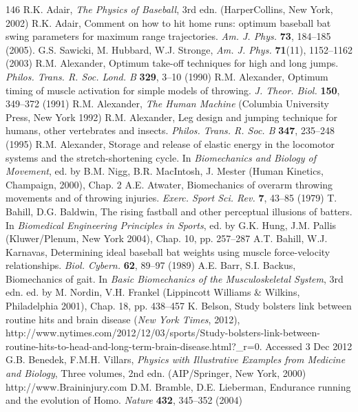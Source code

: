 \documentclass[12pt]{book}
\begin{document}
\begin{thebibliography}{146}
 R.K. Adair, \textit{The Physics of Baseball}, 3rd edn. (HarperCollins, New York, 2002)
 R.K. Adair, Comment on how to hit home runs: optimum baseball bat swing parameters for maximum range trajectories. \textit{Am. J. Phys.} \textbf{73}, 184--185 (2005). G.S. Sawicki, M. Hubbard, W.J. Stronge, \textit{Am. J. Phys.} \textbf{71}(11), 1152--1162 (2003)
 R.M. Alexander, Optimum take-off techniques for high and long jumps. \textit{Philos. Trans. R. Soc. Lond. B} \textbf{329}, 3--10 (1990)
 R.M. Alexander, Optimum timing of muscle activation for simple models of throwing. \textit{J. Theor. Biol.} \textbf{150}, 349--372 (1991)
 R.M. Alexander, \textit{The Human Machine} (Columbia University Press, New York 1992)
 R.M. Alexander, Leg design and jumping technique for humans, other vertebrates and insects. \textit{Philos. Trans. R. Soc. B} \textbf{347}, 235--248 (1995)
 R.M. Alexander, Storage and release of elastic energy in the locomotor systems and the stretch-shortening cycle. In \textit{Biomechanics and Biology of Movement}, ed. by B.M. Nigg, B.R. MacIntosh, J. Mester (Human Kinetics, Champaign, 2000), Chap. 2
 A.E. Atwater, Biomechanics of overarm throwing movements and of throwing injuries. \textit{Exerc. Sport Sci. Rev.} \textbf{7}, 43--85 (1979)
 T. Bahill, D.G. Baldwin, The rising fastball and other perceptual illusions of batters. In \textit{Biomedical Engineering Principles in Sports}, ed. by G.K. Hung, J.M. Pallis (Kluwer/Plenum, New York 2004), Chap. 10, pp. 257--287
 A.T. Bahill, W.J. Karnavas, Determining ideal baseball bat weights using muscle force-velocity relationships. \textit{Biol. Cybern.} \textbf{62}, 89--97 (1989)
 A.E. Barr, S.I. Backus, Biomechanics of gait. In \textit{Basic Biomechanics of the Musculoskeletal System}, 3rd edn. ed. by M. Nordin, V.H. Frankel (Lippincott Williams \& Wilkins, Philadelphia 2001), Chap. 18, pp. 438--457
 K. Belson, Study bolsters link between routine hits and brain disease (\textit{New York Times}, 2012), http://www.nytimes.com/2012/12/03/sports/Study-bolsters-link-between-routine-hits-to-head-and-long-term-brain-disease.html?\_r=0. Accessed 3 Dec 2012
 G.B. Benedek, F.M.H. Villars, \textit{Physics with Illustrative Examples from Medicine and Biology}, Three volumes, 2nd edn. (AIP/Springer, New York, 2000)
 http://www.Braininjury.com
 D.M. Bramble, D.E. Lieberman, Endurance running and the evolution of Homo. \textit{Nature} \textbf{432}, 345--352 (2004)

\end{thebibliography}
\end{document}
